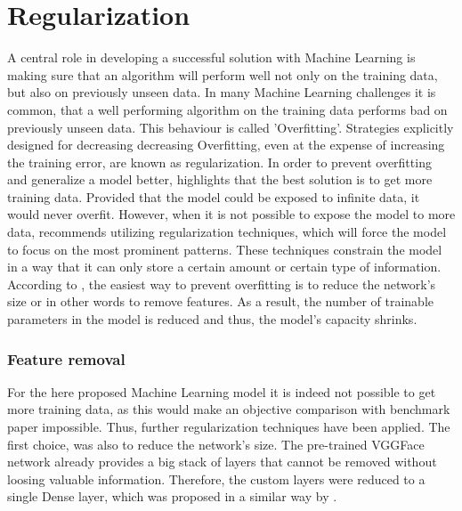 \section{Regularization}
A central role in developing a successful solution with Machine Learning is making sure that an algorithm will perform well not only on the training data, but also on previously unseen data. In many Machine Learning challenges it is common, that a well performing algorithm on the training data performs bad on previously unseen data. This behaviour is called 'Overfitting'. Strategies explicitly designed for decreasing decreasing Overfitting, even at the expense of increasing the training error, are known as regularization. \citep{Goodfellow:2016:DeepLearning}
\newline\newline
In order to prevent overfitting and generalize a model better, \citet{Chollet:2017:DeepLearningPython} highlights that the best solution is to get more training data. Provided that the model could be exposed to infinite data, it would never overfit. However, when it is not possible to expose the model to more data, \citet{Chollet:2017:DeepLearningPython} recommends utilizing regularization techniques, which will force the model to focus on the most prominent patterns. These techniques constrain the model in a way that it can only store a certain amount or certain type of information. According to \citet{Chollet:2017:DeepLearningPython}, the easiest way to prevent overfitting is to reduce the network's size or in other words to remove features. As a result, the number of trainable parameters in the model is reduced and thus, the model's capacity shrinks.

\subsubsection{Feature removal}
For the here proposed Machine Learning model it is indeed not possible to get more training data, as this would make an objective comparison with benchmark paper impossible. Thus, further regularization techniques have been applied. The first choice, was also to reduce the network's size. The pre-trained VGGFace network already provides a big stack of layers that cannot be removed without loosing valuable information. Therefore, the custom layers were reduced to a single Dense layer, which was proposed in a similar way by \citet{Pittaras:2017:FineTuningStrategiesComparison}.

